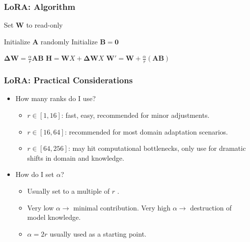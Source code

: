 \documentclass[24pt]{beamer}
\begin{document}
    
    \begin{frame}
    	\frametitle{LoRA: Algorithm}
    	
		\begin{algorithmic}
				\State Set $\mathbf{W}$ to read-only 
			\EndFor
			
				\State Initialize $\mathbf{A}$ randomly
				\State Initialize $\mathbf{B} = \mathbf{0}$ 
			\EndFor
			
				\State $\mathbf{\Delta W} = \frac{\alpha}{r} \mathbf{A} \mathbf{B}$
				\State $\mathbf{H} = \mathbf{W} X + \mathbf{\Delta W} X$ 
			\EndFor
			\State $\mathbf{W}' = \mathbf{W} + \frac{\alpha}{r} (\mathbf{A} \mathbf{B})$ 
		\end{algorithmic}
	\end{frame}
	
	\begin{frame}
		\frametitle{LoRA: Practical Considerations}
		
		\begin{itemize}
			\item How many ranks do I use?
			\begin{itemize}
				\item $r \in [1,16]$: fast, easy, recommended for minor adjustments.
				\item $r \in [16,64]$: recommended for most domain adaptation scenarios.
				\item $r \in [64, 256]$: may hit computational bottlenecks, only use for  dramatic shifts in domain and knowledge.
			\end{itemize}
			
			\item How do I set $\alpha$?
			\begin{itemize}
				\item Usually set to a multiple of $r$ .
				\item Very low $\alpha \rightarrow$ minimal contribution. Very high $\alpha \rightarrow$ destruction of model knowledge.
				\item $\alpha = 2r$ usually used as a starting point.
			\end{itemize}
		\end{itemize}
		
	\end{frame}
	
\end{document}
